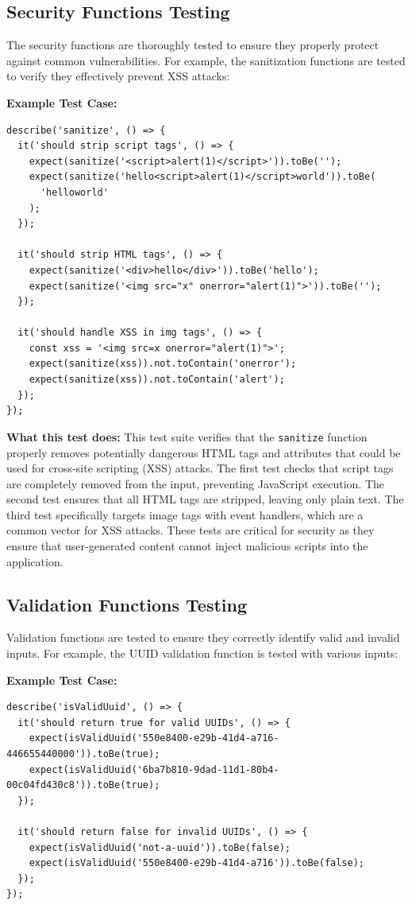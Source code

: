 \subsection{Security Functions Testing}

The security functions are thoroughly tested to ensure they properly protect against common vulnerabilities. For example, the sanitization functions are tested to verify they effectively prevent XSS attacks:

\textbf{Example Test Case:}
\begin{verbatim}
describe('sanitize', () => {
  it('should strip script tags', () => {
    expect(sanitize('<script>alert(1)</script>')).toBe('');
    expect(sanitize('hello<script>alert(1)</script>world')).toBe(
      'helloworld'
    );
  });

  it('should strip HTML tags', () => {
    expect(sanitize('<div>hello</div>')).toBe('hello');
    expect(sanitize('<img src="x" onerror="alert(1)">')).toBe('');
  });

  it('should handle XSS in img tags', () => {
    const xss = '<img src=x onerror="alert(1)">';
    expect(sanitize(xss)).not.toContain('onerror');
    expect(sanitize(xss)).not.toContain('alert');
  });
});
\end{verbatim}

\textbf{What this test does:} This test suite verifies that the \texttt{sanitize} function properly removes potentially dangerous HTML tags and attributes that could be used for cross-site scripting (XSS) attacks. The first test checks that script tags are completely removed from the input, preventing JavaScript execution. The second test ensures that all HTML tags are stripped, leaving only plain text. The third test specifically targets image tags with event handlers, which are a common vector for XSS attacks. These tests are critical for security as they ensure that user-generated content cannot inject malicious scripts into the application.

\subsection{Validation Functions Testing}

Validation functions are tested to ensure they correctly identify valid and invalid inputs. For example, the UUID validation function is tested with various inputs:

\textbf{Example Test Case:}
\begin{verbatim}
describe('isValidUuid', () => {
  it('should return true for valid UUIDs', () => {
    expect(isValidUuid('550e8400-e29b-41d4-a716-446655440000')).toBe(true);
    expect(isValidUuid('6ba7b810-9dad-11d1-80b4-00c04fd430c8')).toBe(true);
  });

  it('should return false for invalid UUIDs', () => {
    expect(isValidUuid('not-a-uuid')).toBe(false);
    expect(isValidUuid('550e8400-e29b-41d4-a716')).toBe(false);
  });
});
\end{verbatim}

